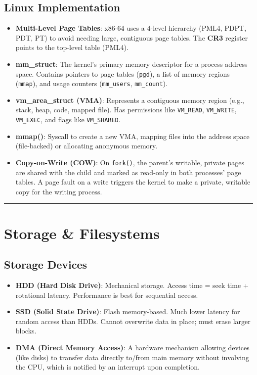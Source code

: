 \documentclass[8pt,a4paper]{article}
\newcommand{\sectiondivider}{\vspace{4pt}\hrule\vspace{4pt}}
\begin{document}
\begin{multicols}{2}
\subsection*{Linux Implementation}
\begin{itemize}
    \item \textbf{Multi-Level Page Tables}: x86-64 uses a 4-level hierarchy (PML4, PDPT, PDT, PT) to avoid needing large, contiguous page tables. The \textbf{CR3} register points to the top-level table (PML4).
    \item \textbf{mm\_struct}: The kernel's primary memory descriptor for a process address space. Contains pointers to page tables (\texttt{pgd}), a list of memory regions (\texttt{mmap}), and usage counters (\texttt{mm\_users}, \texttt{mm\_count}).
    \item \textbf{vm\_area\_struct (VMA)}: Represents a contiguous memory region (e.g., stack, heap, code, mapped file). Has permissions like \texttt{VM\_READ}, \texttt{VM\_WRITE}, \texttt{VM\_EXEC}, and flags like \texttt{VM\_SHARED}.
    \item \textbf{mmap()}: Syscall to create a new VMA, mapping files into the address space (file-backed) or allocating anonymous memory.
    \item \textbf{Copy-on-Write (COW)}: On \texttt{fork()}, the parent's writable, private pages are shared with the child and marked as read-only in both processes' page tables. A page fault on a write triggers the kernel to make a private, writable copy for the writing process.
\end{itemize}

\sectiondivider
\section*{Storage \& Filesystems}
\subsection*{Storage Devices}
\begin{itemize}
    \item \textbf{HDD (Hard Disk Drive)}: Mechanical storage. Access time = seek time + rotational latency. Performance is best for sequential access.
    \item \textbf{SSD (Solid State Drive)}: Flash memory-based. Much lower latency for random access than HDDs. Cannot overwrite data in place; must erase larger blocks.
    \item \textbf{DMA (Direct Memory Access)}: A hardware mechanism allowing devices (like disks) to transfer data directly to/from main memory without involving the CPU, which is notified by an interrupt upon completion.
\end{itemize}


\end{multicols}
\end{document}
